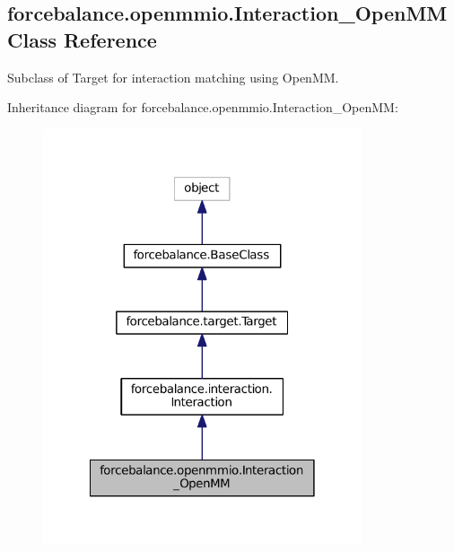 \hypertarget{classforcebalance_1_1openmmio_1_1Interaction__OpenMM}{\subsection{forcebalance.\-openmmio.\-Interaction\-\_\-\-Open\-M\-M Class Reference}
\label{classforcebalance_1_1openmmio_1_1Interaction__OpenMM}
}


Subclass of Target for interaction matching using Open\-M\-M.  




Inheritance diagram for forcebalance.\-openmmio.\-Interaction\-\_\-\-Open\-M\-M\-:\nopagebreak
\begin{figure}[H]
\begin{center}
\leavevmode
\includegraphics[width=266pt]{classforcebalance_1_1openmmio_1_1Interaction__OpenMM__inherit__graph}
\end{center}
\end{figure}


